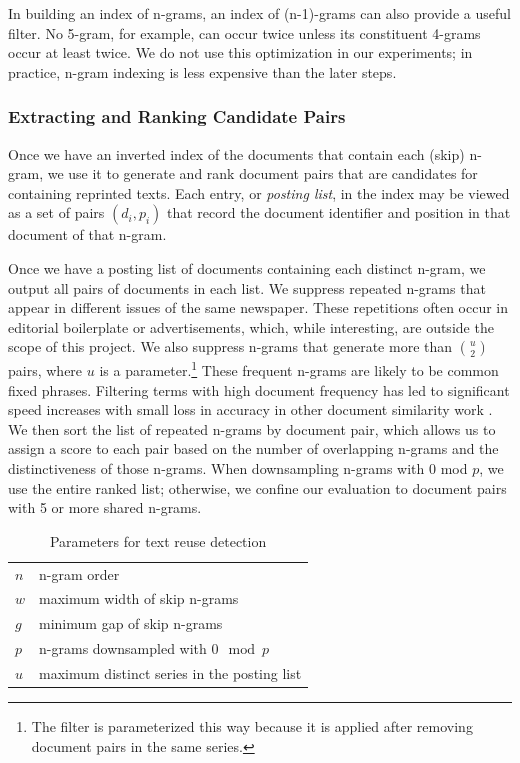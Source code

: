 \documentclass[pdftex,11pt]{article}
\begin{document}
In building an index of n-grams, an index of (n-1)-grams can also
provide a useful filter.  No 5-gram, for example, can occur twice
unless its constituent 4-grams occur at least twice.  We do not use
this optimization in our experiments; in practice, n-gram indexing is
less expensive than the later steps.

\subsubsection{Extracting and Ranking Candidate Pairs}
\label{sec:extracting-pairs}

Once we have an inverted index of the documents that contain each
(skip) n-gram, we use it to generate and rank document pairs that are
candidates for containing reprinted texts.  Each entry, or
\emph{posting list}, in the index may be viewed as a set of pairs
$(d_i, p_i)$ that record the document identifier and position in that
document of that n-gram.

Once we have a posting list of documents containing each distinct
n-gram, we output all pairs of documents in each list.  We suppress
repeated n-grams that appear in different issues of the same
newspaper. These repetitions often occur in editorial boilerplate or
advertisements, which, while interesting, are outside the scope of
this project.  We also suppress n-grams that generate more than $u
\choose 2$ pairs, where $u$ is a parameter.\footnote{The filter is
  parameterized this way because it is applied after removing document
  pairs in the same series.}  These frequent n-grams are likely to be
common fixed phrases.  Filtering terms with high document frequency
has led to significant speed increases with small loss in accuracy in
other document similarity work
\citep{elsayed08:_pairw_docum_simil_large_collec_mapred}.  We then sort
the list of repeated n-grams by document pair, which allows us to
assign a score to each pair based on the number of overlapping n-grams
and the distinctiveness of those n-grams.  When downsampling n-grams
with 0 mod $p$, we use the entire ranked list; otherwise, we confine
our evaluation to document pairs with 5 or more shared n-grams.

\begin{table}
  \centering
  \begin{tabular}{l l} \\
  $n$ & n-gram order \\
  $w$ & maximum width of skip n-grams \\
  $g$ & minimum gap of skip n-grams \\
  $p$ & n-grams downsampled with $0 \mod p$ \\
  $u$ & maximum distinct series in the posting
  list \\
  \end{tabular}
  \caption{Parameters for text reuse detection}
  \label{tab:parameters}
\end{table}
\end{document}
